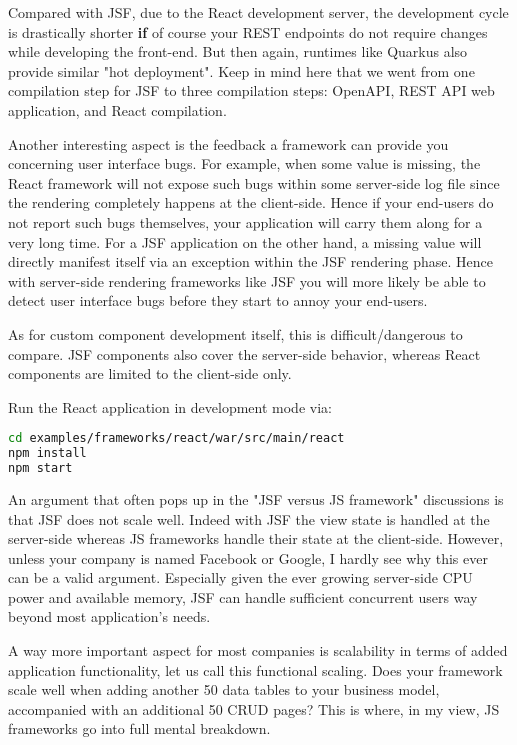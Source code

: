 Compared with JSF, due to the React development server, the development cycle is drastically shorter \textbf{if} of course your REST endpoints do not require changes while developing the front-end.
But then again, runtimes like Quarkus also provide similar "hot deployment".
Keep in mind here that we went from one compilation step for JSF to three compilation steps: OpenAPI, REST API web application, and React compilation.

Another interesting aspect is the feedback a framework can provide you concerning user interface bugs.
For example, when some value is missing, the React framework will not expose such bugs within some server-side log file since the rendering completely happens at the client-side.
Hence if your end-users do not report such bugs themselves, your application will carry them along for a very long time.
For a JSF application on the other hand, a missing value will directly manifest itself via an exception within the JSF rendering phase.
Hence with server-side rendering frameworks like JSF you will more likely be able to detect user interface bugs before they start to annoy your end-users.

As for custom component development itself, this is difficult/dangerous to compare.
JSF components also cover the server-side behavior, whereas React components are limited to the client-side only.

Run the React application in development mode via:
\begin{lstlisting}[language=bash]
cd examples/frameworks/react/war/src/main/react
npm install
npm start
\end{lstlisting}

An argument that often pops up in the "JSF versus JS framework" discussions is that JSF does not scale well.
Indeed with JSF the view state is handled at the server-side whereas JS frameworks handle their state at the client-side.
However, unless your company is named Facebook or Google, I hardly see why this ever can be a valid argument.
Especially given the ever growing server-side CPU power and available memory, JSF can handle sufficient concurrent users way beyond most application's needs.

A way more important aspect for most companies is scalability in terms of added application functionality, let us call this functional scaling.
Does your framework scale well when adding another 50 data tables to your business model, accompanied with an additional 50 CRUD pages?
This is where, in my view, JS frameworks go into full mental breakdown.

